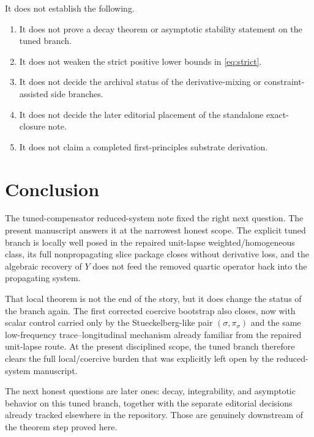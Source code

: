 \documentclass[11pt]{article}
\begin{document}
It does not establish the following.
\begin{enumerate}
    \item It does not prove a decay theorem or asymptotic stability statement on the tuned branch.
    \item It does not weaken the strict positive lower bounds in \eqref{eq:strict}.
    \item It does not decide the archival status of the derivative-mixing or constraint-assisted side branches.
    \item It does not decide the later editorial placement of the standalone exact-closure note.
    \item It does not claim a completed first-principles substrate derivation.
\end{enumerate}

\section{Conclusion}

The tuned-compensator reduced-system note fixed the right next question. The present manuscript answers it at the narrowest honest scope. The explicit tuned branch is locally well posed in the repaired unit-lapse weighted/homogeneous class, its full nonpropagating slice package closes without derivative loss, and the algebraic recovery of \(Y\) does not feed the removed quartic operator back into the propagating system.

That local theorem is not the end of the story, but it does change the status of the branch again. The first corrected coercive bootstrap also closes, now with scalar control carried only by the Stueckelberg-like pair \((\sigma,\pi_\sigma)\) and the same low-frequency trace--longitudinal mechanism already familiar from the repaired unit-lapse route. At the present disciplined scope, the tuned branch therefore clears the full local/coercive burden that was explicitly left open by the reduced-system manuscript.

The next honest questions are later ones: decay, integrability, and asymptotic behavior on this tuned branch, together with the separate editorial decisions already tracked elsewhere in the repository. Those are genuinely downstream of the theorem step proved here.
\end{document}
